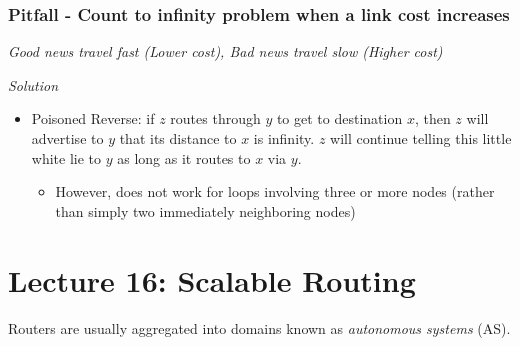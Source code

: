 \documentclass[a4paper]{article}
\begin{document}
\subsubsection{Pitfall - Count to infinity problem when a link cost increases}
\textit{Good news travel fast (Lower cost), Bad news travel slow (Higher cost)}

\medskip

\noindent\textit{Solution}
\begin{itemize}
    \item Poisoned Reverse: if $z$ routes through $y$ to get to destination $x$, then $z$ will advertise to $y$ that its distance to $x$ is infinity. $z$ will continue telling this little white lie to $y$ as long as it routes to $x$ via $y$.
    \begin{itemize}[label=$\circ$]
        \item However, does not work for loops involving three or more nodes (rather than simply two immediately neighboring nodes)
    \end{itemize}
\end{itemize}
\newpage
\section{Lecture 16: Scalable Routing}
Routers are usually aggregated into domains known as \textit{autonomous systems} (AS).
\end{document}
